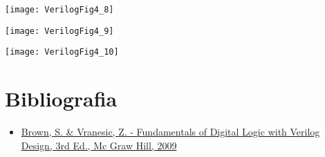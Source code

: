 \begin{frame}{\insertsection}   \centering
    \texttt{[image: VerilogFig4\_8]}
\end{frame}

\begin{frame}{\insertsection}   \centering
    \texttt{[image: VerilogFig4\_9]}
\end{frame}

\begin{frame}{\insertsection}   \centering
    \texttt{[image: VerilogFig4\_10]}
\end{frame}

\section{Bibliografia} %

\begin{frame}{\insertsection} 
	\begin{itemize}
		\item \href{https://www.google.com.br/search?q=filetype\%3Apdf+Fundamentals+of+Digital+Logic+with+Verilog+Design+&oq=filetype\%3Apdf}{Brown, S. \& Vranesic, Z. - Fundamentals of Digital Logic with Verilog Design, 3rd Ed., Mc Graw Hill, 2009}
	\end{itemize}
\end{frame}

\begin{frame}
	\titlepage
\end{frame} 

